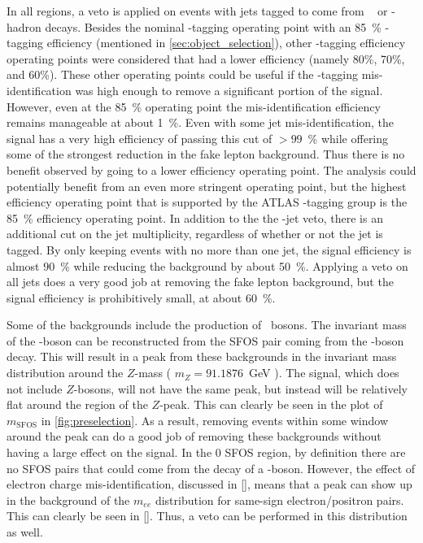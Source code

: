 In all regions, a veto is applied on events with jets tagged to come from \bee~
or \bee-hadron decays. Besides the nominal \bee-tagging operating
point with an 85~\% \bee-tagging efficiency (mentioned in
\sec\ref{sec:object_selection}), other 
\bee-tagging efficiency operating points
were considered that had a lower efficiency (namely 80\%, 70\%, and 60\%). 
These other operating points could be useful if the \bee-tagging mis-identification
was high enough to remove a significant portion of the signal. However,
even at the 85~\% operating point
the mis-identification efficiency remains manageable at about 1~\%. 
Even with some jet mis-identification, the signal has
a very high efficiency of passing this 
cut of $> 99$~\% while offering some of the strongest 
reduction in the fake lepton background. 
Thus there is no benefit observed by going to a lower efficiency operating point.
The analysis could potentially benefit from an even more stringent 
operating point, but the highest
efficiency operating point that is supported by the ATLAS
\bee-tagging group is the 85~\% efficiency operating point.
In addition to the the \bee-jet veto, there is an additional
cut on the jet multiplicity, regardless of whether or not 
the jet is tagged. By only keeping
events with no more than one jet, 
the signal efficiency is almost $90$~\% while reducing
the background by about 50~\%.  Applying a veto on 
all jets does a very good job at removing the fake lepton
background, but the signal efficiency is prohibitively small, at about 60~\%. 


Some of the backgrounds include the production of \z~bosons.
The invariant mass of the \z-boson can be reconstructed from the SFOS
pair coming from the \z-boson decay. This will result in a peak from these backgrounds
in the invariant mass distribution around 
the $Z$-mass ( $m_{Z}=91.1876$~GeV \cite{PDG:2014}).
The signal, which does not include $Z$-bosons, will not have the same peak, but instead
will be relatively flat around the region of the $Z$-peak. 
This can clearly be seen in the plot of $m_{\textrm{SFOS}}$ 
in \fig\ref{fig:preselection}.
As a result, removing events within some window around the peak can do a good job
of removing these backgrounds without having a large effect on the signal.
In the 0 SFOS region, by definition there are no SFOS pairs that could come 
from the decay of a \z-boson. However, the effect of electron charge mis-identification,
discussed in \sec\ref{}, means that a peak can show up in the background
of the $m_{ee}$ distribution for same-sign electron/positron pairs. 
This can clearly be seen in \fig\ref{}.
Thus, a veto can be performed in this distribution as well.

